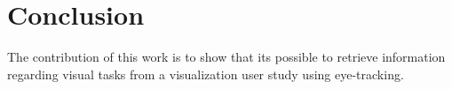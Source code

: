 \section{Conclusion}
The contribution of this work is to show that its possible to retrieve information regarding visual tasks from a visualization user study using eye-tracking.